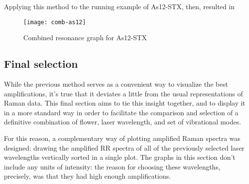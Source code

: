 Applying this method to the running example of As12-STX, then, resulted in 

\begin{figure}
    \texttt{[image: comb-as12]}
    \caption[Combined resonance graph for As12-STX]{Combined resonance graph for As12-STX}
\end{figure}





\subsection{Final selection}
While the previous method serves as a convenient way to visualize the best amplifications, it's true that it deviates a little from the usual representations of Raman data.
This final section aims to tie this insight together, and to display it in a more standard way in order to facilitate the comparison and selection of a definitive combination of flower, laser wavelength, and set of vibrational modes.

For this reason, a complementary way of plotting amplified Raman spectra was designed: drawing the amplified RR spectra of all of the previously selected laser wavelengths vertically sorted in a single plot.
The graphs in this section don't include any units of intensity: the reason for choosing these wavelengths, precisely, was that they had high enough amplifications.
